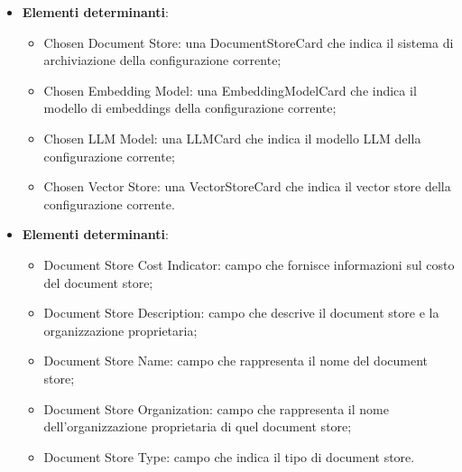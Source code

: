 \documentclass[10pt, a4paper]{article}
\begin{document}
\label{CurrentConfigurationCarouselDettaglio}
\begin{itemize}
    \item \textbf{Elementi determinanti}:
     \begin{itemize}
        \item Chosen Document Store: una DocumentStoreCard che indica il sistema di archiviazione della configurazione corrente;
        \item Chosen Embedding Model: una EmbeddingModelCard che indica il modello di embeddings della configurazione corrente;
        \item Chosen LLM Model: una LLMCard che indica il modello LLM della configurazione corrente;
        \item Chosen Vector Store: una VectorStoreCard che indica il vector store della configurazione corrente.
    \end{itemize}
\end{itemize}

\label{DocumentStoreCardDettaglio}
\begin{itemize}
    \item \textbf{Elementi determinanti}:
     \begin{itemize}
        \item Document Store Cost Indicator: campo che fornisce informazioni sul costo del document store;
        \item Document Store Description: campo che descrive il document store e la organizzazione proprietaria;
        \item Document Store Name: campo che rappresenta il nome del document store;
        \item Document Store Organization: campo che rappresenta il nome dell'organizzazione proprietaria di quel document store;
        \item Document Store Type: campo che indica il tipo di document store.
    \end{itemize}
\end{itemize}
\end{document}
